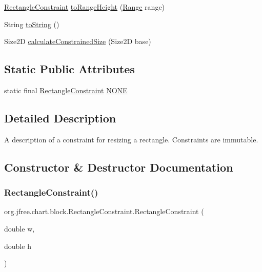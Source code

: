 \begin{DoxyCompactItemize}
\item 
\mbox{\hyperlink{classorg_1_1jfree_1_1chart_1_1block_1_1_rectangle_constraint}{Rectangle\+Constraint}} \mbox{\hyperlink{classorg_1_1jfree_1_1chart_1_1block_1_1_rectangle_constraint_a7d37313a32f867a3623dc5d9c7bc93c4}{to\+Range\+Height}} (\mbox{\hyperlink{classorg_1_1jfree_1_1data_1_1_range}{Range}} range)
\item 
String \mbox{\hyperlink{classorg_1_1jfree_1_1chart_1_1block_1_1_rectangle_constraint_a09892b7a3bbe624ed9a8fff4fbb146ff}{to\+String}} ()
\item 
Size2D \mbox{\hyperlink{classorg_1_1jfree_1_1chart_1_1block_1_1_rectangle_constraint_a40d84d4d0e68e8c1eb93c3609ffa0dd3}{calculate\+Constrained\+Size}} (Size2D base)
\end{DoxyCompactItemize}
\subsection*{Static Public Attributes}
\begin{DoxyCompactItemize}
\item 
static final \mbox{\hyperlink{classorg_1_1jfree_1_1chart_1_1block_1_1_rectangle_constraint}{Rectangle\+Constraint}} \mbox{\hyperlink{classorg_1_1jfree_1_1chart_1_1block_1_1_rectangle_constraint_ae7da6ac3fc652f76e39c1c421e8b7e99}{N\+O\+NE}}
\end{DoxyCompactItemize}


\subsection{Detailed Description}
A description of a constraint for resizing a rectangle. Constraints are immutable. 

\subsection{Constructor \& Destructor Documentation}
\mbox{\label{classorg_1_1jfree_1_1chart_1_1block_1_1_rectangle_constraint_af72e3b34ff39c2e1cb2873a41622bada}} 
\subsubsection{\texorpdfstring{Rectangle\+Constraint()}{RectangleConstraint()}\hspace{0.1cm}{\footnotesize\ttfamily [1/5]}}
{\footnotesize\ttfamily org.\+jfree.\+chart.\+block.\+Rectangle\+Constraint.\+Rectangle\+Constraint (\begin{DoxyParamCaption}\item[{double}]{w,  }\item[{double}]{h }\end{DoxyParamCaption})}

